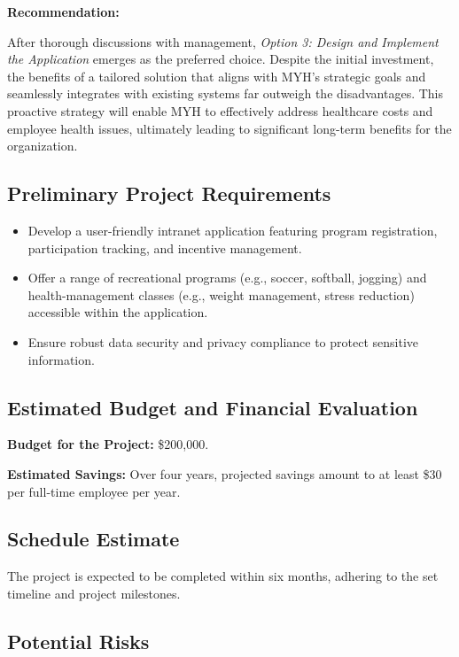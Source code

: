 \textbf{Recommendation:}

After thorough discussions with management, \textit{Option 3: Design and Implement the Application} emerges as the preferred choice. Despite the initial investment, the benefits of a tailored solution that aligns with MYH's strategic goals and seamlessly integrates with existing systems far outweigh the disadvantages. This proactive strategy will enable MYH to effectively address healthcare costs and employee health issues, ultimately leading to significant long-term benefits for the organization.

\subsection{Preliminary Project Requirements}

\begin{itemize}
    \item Develop a user-friendly intranet application featuring program registration, participation tracking, and incentive management.
    \item Offer a range of recreational programs (e.g., soccer, softball, jogging) and health-management classes (e.g., weight management, stress reduction) accessible within the application.
    \item Ensure robust data security and privacy compliance to protect sensitive information.
\end{itemize}

\subsection{Estimated Budget and Financial Evaluation}

\textbf{Budget for the Project:} \$200,000.

\textbf{Estimated Savings:} Over four years, projected savings amount to at least \$30 per full-time employee per year.

\subsection{Schedule Estimate}

The project is expected to be completed within six months, adhering to the set timeline and project milestones.

\subsection{Potential Risks}

